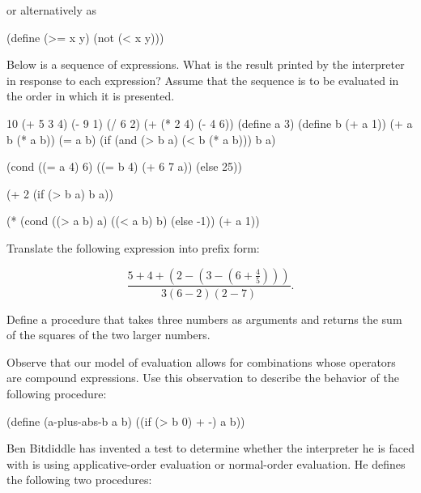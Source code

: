 \noindent
or alternatively as

\begin{codeBlock}
(define (>= x y) (not (< x y)))
\end{codeBlock}

\begin{exerciseGroup}
\label{Exercise 1.1}
 Below is a sequence of expressions.
What is the result printed by the interpreter in response to each expression?
Assume that the sequence is to be evaluated in the order in which it is
presented.

\begin{codeBlock}
10
(+ 5 3 4)
(- 9 1)
(/ 6 2)
(+ (* 2 4) (- 4 6))
(define a 3)
(define b (+ a 1))
(+ a b (* a b))
(= a b)
(if (and (> b a) (< b (* a b)))
    b
    a)
\end{codeBlock}

\begin{codeBlock}
(cond ((= a 4) 6)
      ((= b 4) (+ 6 7 a))
      (else 25))
\end{codeBlock}

\begin{codeBlock}
(+ 2 (if (> b a) b a))
\end{codeBlock}

\begin{codeBlock}
(* (cond ((> a b) a)
         ((< a b) b)
         (else -1))
   (+ a 1))
\end{codeBlock}

\label{Exercise 1.2}
 Translate the following expression
into prefix form:

$$\frac{5 + 4 + (2 - (3 - (6 + \frac{4}{5})))}{3(6 - 2)(2 - 7)}.$$


\label{Exercise 1.3}
 Define a procedure that takes three
numbers as arguments and returns the sum of the squares of the two larger
numbers.

\label{Exercise 1.4}
 Observe that our model of
evaluation allows for combinations whose operators are compound expressions.
Use this observation to describe the behavior of the following procedure:

\begin{codeBlock}
(define (a-plus-abs-b a b)
  ((if (> b 0) + -) a b))
\end{codeBlock}

\label{Exercise 1.5}
 Ben Bitdiddle has invented a test
to determine whether the interpreter he is faced with is using
applicative-order evaluation or normal-order evaluation.  He defines the
following two procedures:


\end{exerciseGroup}

